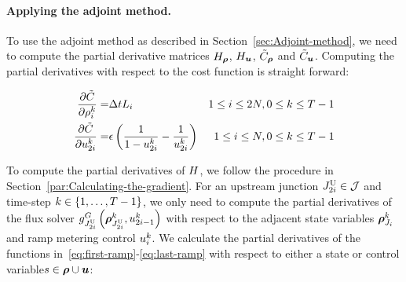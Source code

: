 														
							\paragraph{Applying the adjoint method.}
														
							To use the adjoint method as described in Section~\ref{sec:Adjoint-method},
							we need to compute the partial derivative matrices $\Hx$, $\Hu$,
							$\tilde{C}_{\state}$ and $\tilde{C}_{\control}$. Computing the partial
							derivatives with respect to the cost function is straight forward:
														
							\begin{eqnarray*}
								\frac{\partial\tilde{C}}{\partial\rho_{i}^{k}}= & \Delta tL_{i} & 1\le i\le2N,0\le k\le T-1\\
								\frac{\partial\tilde{C}}{\partial u_{2i}^{k}}= & \epsilon\left(\frac{1}{1-u_{2i}^{k}}-\frac{1}{u_{2i}^{k}}\right) & 1\le i\le N,0\le k\le T-1
							\end{eqnarray*}
														
														
							To compute the partial derivatives of $H$, we follow the procedure
							in Section~\ref{par:Calculating-the-gradient}. For an upstream junction
							$J_{2i}^{\text{U}}\in\mathcal{J}$ and time-step $k\in\left\{ 1,\ldots,T-1\right\}$,
							we only need to compute the partial derivatives of the flux solver
							$\god_{\jup{2\link}}\left(\juncstate{\jup{2\link}}{\tind},\ramp_{2\link-1}^{\tind}\right)_{\text{}}$
							with respect to the adjacent state variables $\juncstate{\jn_{\link}}{\tind}$
							and ramp metering control $u_{i}^{k}$. We calculate the
							partial derivatives of the functions in~\eqref{eq:first-ramp}-\eqref{eq:last-ramp}
							with respect to either a state or control variable$s\in\state\cup\control$:
														
